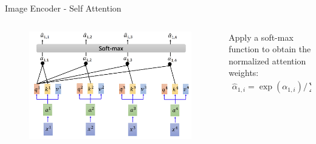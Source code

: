 \documentclass[aspectratio=169,xcolor=dvipsnames]{beamer}
\begin{document}
\begin{frame}{Image Encoder - Self Attention}
    \begin{columns}
        \begin{column}{0.6\textwidth}
            \begin{figure}
                \centering
                \includegraphics[width=1\linewidth]{figures/self_attention_softmax.png}
                \label{self_attention_softmax}
            \end{figure}
        \end{column}
        \begin{column}{0.4\textwidth}
            Apply a soft-max function to obtain the normalized attention weights:
            \begin{align*}
                \hat{\alpha}_{1,i}= \exp(\alpha_{1,i}) / \sum\nolimits_{j=1}^{N} \exp(\alpha_{1,j}) 
            \end{align*}
        \end{column}
    \end{columns}
\end{frame}

\end{document}
